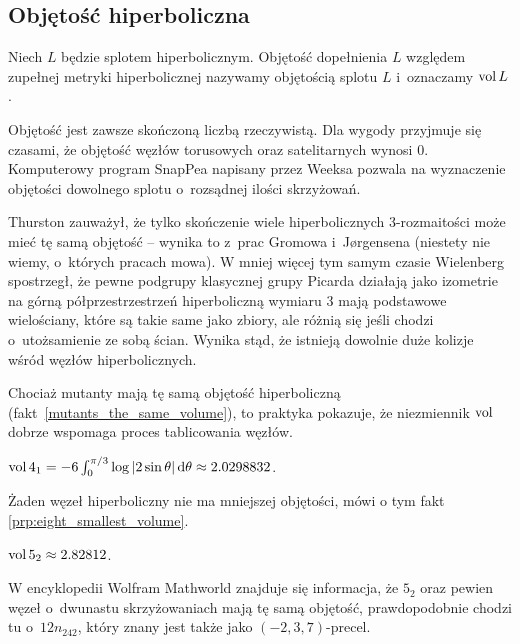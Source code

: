 
\subsection{Objętość hiperboliczna}

%
\begin{definition}[objętość]
    Niech $L$ będzie splotem hiperbolicznym.
    Objętość dopełnienia $L$ względem zupełnej metryki hiperbolicznej nazywamy objętością splotu $L$ i~oznaczamy $\operatorname{vol} L$.
\end{definition}

Objętość jest zawsze skończoną liczbą rzeczywistą.
Dla wygody przyjmuje się czasami, że objętość węzłów torusowych oraz satelitarnych wynosi $0$.
Komputerowy program SnapPea napisany przez Weeksa pozwala na wyznaczenie objętości dowolnego splotu o~rozsądnej ilości skrzyżowań.

Thurston \cite[s. 365]{thurston82} zauważył, że tylko skończenie wiele hiperbolicznych 3-rozmaitości może mieć tę samą objętość -- wynika to z~prac Gromowa i~Jørgensena (niestety nie wiemy, o~których pracach mowa).
%
W mniej więcej tym samym czasie Wielenberg \cite{wielenberg81} spostrzegł, że pewne podgrupy klasycznej grupy Picarda działają jako izometrie na górną półprzestrzestrzeń hiperboliczną wymiaru 3 mają podstawowe wielościany, które są takie same jako zbiory, ale różnią się jeśli chodzi o~utożsamienie ze sobą ścian.
%
%
Wynika stąd, że istnieją dowolnie duże kolizje wśród węzłów hiperbolicznych.

Chociaż mutanty mają tę samą objętość hiperboliczną (fakt~\ref{mutants_the_same_volume}), to praktyka pokazuje, że niezmiennik $\operatorname{vol}$ dobrze wspomaga proces tablicowania węzłów.
%

\begin{example}
    $\operatorname{vol} 4_1 = -6 \int_{0}^{\pi/3} \log |2\sin \theta| \,\mathrm{d}\theta \approx 2.0298832$.
\end{example}

Żaden węzeł hiperboliczny nie ma mniejszej objętości, mówi o tym fakt \ref{prp:eight_smallest_volume}.

\begin{example}
    $\operatorname{vol} 5_2 \approx 2.82812$.
\end{example}

W encyklopedii Wolfram Mathworld znajduje się informacja, że $5_2$ oraz pewien węzeł o~dwunastu skrzyżowaniach mają tę samą objętość, prawdopodobnie chodzi tu o~$12n_{242}$, który znany jest także jako $(-2, 3, 7)$-precel.
%
%

